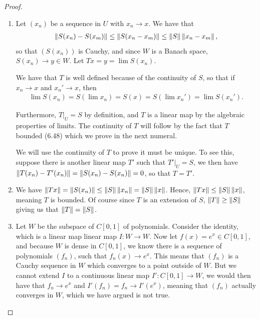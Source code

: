 \begin{proof}
\begin{enumerate}
    \item Let $(x_n)$ be a sequence in $U$ with $x_n \to x$.
    We have that 
    \begin{align*}
        \left\lVert S(x_n) - S(x_m)\right\rVert 
        \leq \left\lVert S(x_n - x_m)\right\rVert 
        \leq \left\lVert S\right\rVert\left\lVert x_n - x_m\right\rVert,
    \end{align*}
    so that $(S(x_n))$ is Cauchy, and since $W$ is a Banach space, $S(x_n) \to y \in W$.
    Let $Tx = y = \lim S(x_n)$.

    We have that $T$ is well defined because of the continuity of $S$, so that if $x_n \to x$ and $x_n' \to x$, then 
    \begin{align*}
        \lim S(x_n) 
        = S(\lim x_n) 
        = S(x) 
        = S(\lim x_n') 
        = \lim S(x_n').
    \end{align*}

    Furthermore, $T|_U = S$ by definition, and $T$ is a linear map by the algebraic properties of limits.
    The continuity of $T$ will follow by the fact that $T$ bounded (6.48) which we prove in the next numeral.
    
    We will use the continuity of $T$ to prove it must be unique.
    To see this, suppose there is another linear map $T'$ such that $T'|_U = S$, we then have $\left\lVert T(x_n) - T'(x_n)\right\rVert = \left\lVert S(x_n) - S(x_n)\right\rVert = 0$, so that $T = T'$.
    
    \item We have $\left\lVert Tx\right\rVert = \left\lVert S(x_n)\right\rVert \leq \left\lVert S\right\rVert\left\lVert x_n\right\rVert = \left\lVert S\right\rVert\left\lVert x\right\rVert$.
    Hence, $\left\lVert Tx\right\rVert \leq \left\lVert S\right\rVert\left\lVert x\right\rVert$, meaning $T$ is bounded. 
    Of course since $T$ is an extension of $S$, $\left\lVert T\right\rVert \geq \left\lVert S\right\rVert$ giving us that $\left\lVert T\right\rVert = \left\lVert S\right\rVert$.
    
    \item Let $W$ be the subspace of $C[0,1]$ of polynomials.
    Consider the identity, which is a linear map linear map $I: W \to W$.
    Now let $f(x) = e^x \in C[0,1]$, and because $W$ is dense in $C[0,1]$, we know there is a sequence of polynomials $(f_n)$, such that $f_n(x) \to e^x$.
    This means that $(f_n)$ is a Cauchy sequence in $W$ which converges to a point outside of $W$.
    But we cannot extend $I$ to a continuous linear map $I': C[0,1] \to W$, we would then have that $f_n \to e^x$ and $I'(f_n) = f_n \to I'(e^x)$, meaning that $(f_n)$ actually converges in $W$, which we have argued is not true.
\end{enumerate}
\end{proof} 

